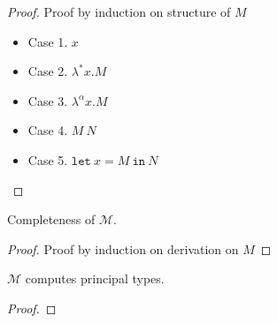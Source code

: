 \begin{proof}
  Proof by induction on structure of $M$
  \begin{itemize}
  \item Case 1. $x$
  \item Case 2. $\lambda^{*} x. M$
  \item Case 3. $\lambda ^{\alpha}x. M$
  \item Case 4. $M\ N$
  \item Case 5. $\texttt{let}\ x = M\ \texttt{in}\ N$
  \end{itemize}

\end{proof}

\begin{thm}
  Completeness of $\mathcal{M}$.
\end{thm}
\begin{proof}
  Proof by induction on derivation on $M$
\end{proof}

\begin{thm}
  $\mathcal{M}$ computes principal types.
\end{thm}
\begin{proof}

\end{proof}